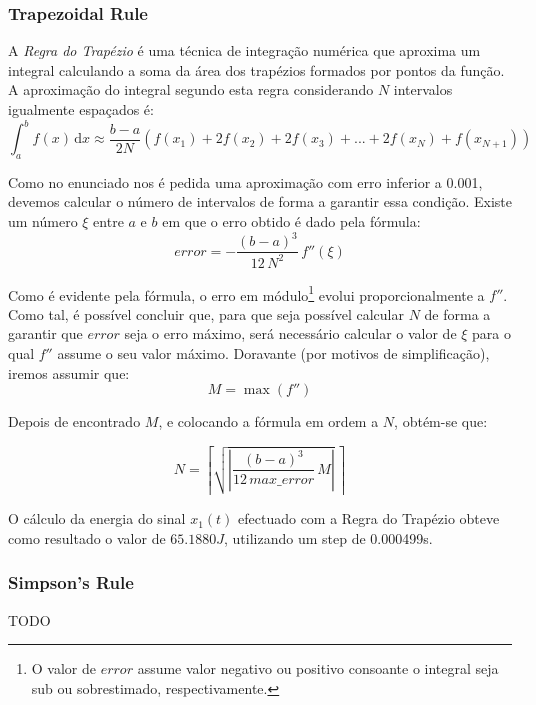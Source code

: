 \documentclass[a4paper]{article}
\begin{document}
\subsubsection{Trapezoidal Rule}
\noindent A \emph{Regra do Trapézio} é uma técnica de integração numérica que aproxima um integral calculando a soma da área dos trapézios formados por pontos da função. A aproximação do integral segundo esta regra considerando $N$ intervalos igualmente espaçados é:
\begin{equation}
\int_{a}^{b} f(x) \, \mathrm{d} x \approx \frac{b-a}{2N} (f(x_{1}) + 2 f(x_{2}) + 2 f(x_{3}) + ... + 2 f(x_{N}) + f(x_{N+1}))
\end{equation}

\noindent Como no enunciado nos é pedida uma aproximação com erro inferior a 0.001, devemos calcular o número de intervalos de forma a garantir essa condição. Existe um número $\xi$ entre $a$ e $b$ em que o erro obtido é dado pela fórmula:
\begin{equation}
error = -\frac{(b-a)^3}{12 \, N^2} \, f''(\xi)
\end{equation}

\noindent Como é evidente pela fórmula, o erro em módulo\footnote{O valor de $error$ assume valor negativo ou positivo consoante o integral seja sub ou sobrestimado, respectivamente.} evolui proporcionalmente a $f''$. Como tal, é possível concluir que, para que seja possível calcular $N$ de forma a garantir que $error$ seja o erro máximo, será necessário calcular o valor de $\xi$ para o qual $f''$ assume o seu valor máximo. Doravante (por motivos de simplificação), iremos assumir que:
\begin{equation}
M = \max(f'')
\end{equation}

\noindent Depois de encontrado $M$, e colocando a fórmula em ordem a $N$, obtém-se que:

\begin{equation}
N = \left\lceil \sqrt{\left| \frac{(b-a)^3}{12 \, max\_error} \, M \right|} \, \right\rceil
\end{equation}

O cálculo da energia do sinal $x_{1}(t)$ efectuado com a Regra do Trapézio obteve como resultado o valor de $65.1880 J$, utilizando um step de 0.000499s.

\subsubsection{Simpson's Rule}
\noindent TODO
\end{document}
